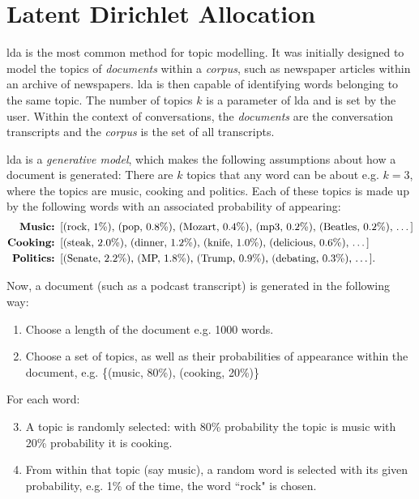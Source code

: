 \section{Latent Dirichlet Allocation \label{ssec: LDA}}
    \Gls{lda}\cite{blei2003latent} is the most common method for topic modelling. It was initially designed to model the topics of \textit{documents} within a \textit{corpus}, such as newspaper articles within an archive of newspapers. \gls{lda} is then capable of identifying words belonging to the same topic. The number of topics $k$ is a parameter of \gls{lda} and is set by the user.
    Within the context of conversations, the \textit{documents} are the conversation transcripts and the \textit{corpus} is the set of all transcripts.
    
    \gls{lda} is a \textit{generative model}, which makes the following assumptions about how a document is generated: There are $k$ topics that any word can be about e.g. $k=3$, where the topics are music, cooking and politics. Each of these topics is made up by the following words with an associated probability of appearing:
    \begin{align*}
        \textbf{Music:  }& \text{[(rock, 1\%), (pop, 0.8\%), (Mozart, 0.4\%), (mp3, 0.2\%), (Beatles, 0.2\%), \dots]}\\
        \textbf{Cooking:    }& \text{[(steak, 2.0\%), (dinner, 1.2\%), (knife, 1.0\%), (delicious, 0.6\%), \dots]}\\
        \textbf{Politics:   }& \text{[(Senate, 2.2\%), (MP, 1.8\%), (Trump, 0.9\%), (debating, 0.3\%), \dots]}.
    \end{align*} 
     
    Now, a document (such as a podcast transcript) is generated in the following way:
     
    \begin{enumerate}
        \item Choose a length of the document e.g. 1000 words.
        \item Choose a set of topics, as well as their probabilities of appearance within the document, e.g. \{(music, 80\%), (cooking, 20\%)\}
    \end{enumerate}
    
    For each word:
    \begin{enumerate}[leftmargin=6em]
    \setcounter{enumi}{2}
        \item A topic is randomly selected: with 80\% probability the topic is music with 20\% probability it is cooking.
        \item From within that topic (say music), a random word is selected with its given probability, e.g. 1\% of the time, the word ``rock" is chosen.
    \end{enumerate}
    
